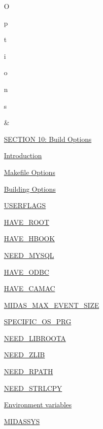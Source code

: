 \begin{TabularC}{2}
\begin{TabularC}{2}
 \par
O\par
p\par
t\par
i\par
o\par
n\par
s\par
   &\label{O_Contents_Page_BuildingOptions_section_index}
\hypertarget{O_Contents_Page_BuildingOptions_section_index}{}
 \par
 \hyperlink{BuildingOptions}{SECTION 10: Build Options} 
\begin{DoxyItemize}
\item \hyperlink{BuildingOptions_BO_Intro}{Introduction} 
\item \hyperlink{BuildingOptions_BO_makefile_option}{Makefile Options} 
\item \hyperlink{BuildingOptions_BO_building_option}{Building Options} 
\begin{DoxyItemize}
\item \hyperlink{BuildingOptions_BO_USERFLAGS}{USERFLAGS} 
\item \hyperlink{BuildingOptions_BO_HAVE_ROOT}{HAVE\_\-ROOT} 
\item \hyperlink{BuildingOptions_BO_HAVE_HBOOK}{HAVE\_\-HBOOK} 
\item \hyperlink{BuildingOptions_BO_NEED_MYSQL}{NEED\_\-MYSQL} 
\item \hyperlink{BuildingOptions_BO_HAVE_ODBC}{HAVE\_\-ODBC} 
\item \hyperlink{BuildingOptions_BO_HAVE_CAMAC}{HAVE\_\-CAMAC} 
\item \hyperlink{BuildingOptions_BO_MIDAS_MAX_EVENT_SIZE}{MIDAS\_\-MAX\_\-EVENT\_\-SIZE} 
\item \hyperlink{BuildingOptions_BO_SPECIFIC_OS_PRG}{SPECIFIC\_\-OS\_\-PRG} 
\item \hyperlink{BuildingOptions_BO_NEED_LIBROOTA}{NEED\_\-LIBROOTA} 
\item \hyperlink{BuildingOptions_BO_NEED_ZLIB}{NEED\_\-ZLIB} 
\item \hyperlink{BuildingOptions_BO_NEED_RPATH}{NEED\_\-RPATH} 
\item \hyperlink{BuildingOptions_BO_NEED_STRLCPY}{NEED\_\-STRLCPY} 
\end{DoxyItemize}
\item \hyperlink{BuildingOptions_BO_Environment_variables}{Environment variables} 
\begin{DoxyItemize}
\item \hyperlink{BuildingOptions_BO_MIDASSYS}{MIDASSYS} 

\end{DoxyItemize}
\end{DoxyItemize}
\end{TabularC}
\end{TabularC}
